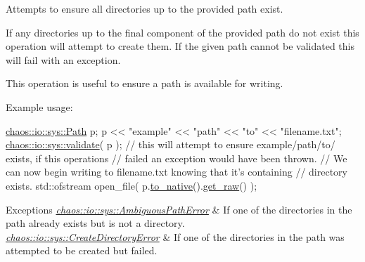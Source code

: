 Attempts to ensure all directories up to the provided path exist. 

If any directories up to the final component of the provided path do not exist this operation will attempt to create them. If the given path cannot be validated this will fail with an exception.

This operation is useful to ensure a path is available for writing.

Example usage\-:


\begin{DoxyCode}
\hyperlink{classchaos_1_1io_1_1sys_1_1_path}{chaos::io::sys::Path} p;
p << \textcolor{stringliteral}{"example"} << \textcolor{stringliteral}{"path"} << \textcolor{stringliteral}{"to"} << \textcolor{stringliteral}{"filename.txt"};
\hyperlink{namespacechaos_1_1io_1_1sys_a15e20b105c40cf4d73b13afe87ce1781}{chaos::io::sys::validate}( p );
\textcolor{comment}{// this will attempt to ensure example/path/to/ exists, if this operations}
\textcolor{comment}{// failed an exception would have been thrown.}
\textcolor{comment}{// We can now begin writing to filename.txt knowing that it's containing}
\textcolor{comment}{// directory exists.}
std::ofstream open\_file( p.\hyperlink{classchaos_1_1io_1_1sys_1_1_path_adb68b7589d18dc78f19d9dd6936d9833}{to\_native}().\hyperlink{classchaos_1_1uni_1_1_u_t_f8_string_a91d3bb4cfbfb573b3fa6ecf3312f4dee}{get\_raw}() );
\end{DoxyCode}



\begin{DoxyExceptions}{Exceptions}
{\em \hyperlink{classchaos_1_1io_1_1sys_1_1_ambiguous_path_error}{chaos\-::io\-::sys\-::\-Ambiguous\-Path\-Error}} & If one of the directories in the path already exists but is not a directory. \\
\hline
{\em \hyperlink{classchaos_1_1io_1_1sys_1_1_create_directory_error}{chaos\-::io\-::sys\-::\-Create\-Directory\-Error}} & If one of the directories in the path was attempted to be created but failed. \\
\hline
\end{DoxyExceptions}
